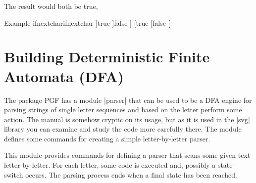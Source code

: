 \begin{teXXX}
\@ifnextchar]{true}{false}] 
 ] %
\@ifnextchar[{true [}{false} [ %
\makeatother
\end{texexample}


\section{Building Deterministic Finite Automata (DFA)}
\label{section-module-parser}

The package PGF has a module |parser| that can be used to be a DFA engine for parsing strings of single letter sequences and based on the letter perform some action. The manual is somehow cryptic on its usage, but as it is
used in the |svg| library you can examine and study the code more carefully there.
The module defines some commands for creating a simple
  letter-by-letter parser.

This module provides commands for defining a parser that scans some
given text letter-by-letter. For each letter, some code is executed
and, possibly a state-switch occurs. The parsing process ends when a
final state has been reached.

